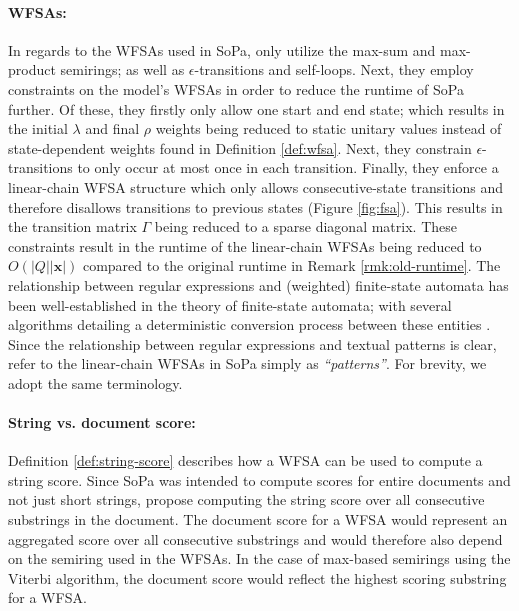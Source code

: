 \paragraph{WFSAs:} In regards to the WFSAs used in SoPa, \citet{schwartz2018sopa} only utilize the max-sum and max-product semirings; as well as $\epsilon$-transitions and self-loops. Next, they employ constraints on the model's WFSAs in order to reduce the runtime of SoPa further. Of these, they firstly only allow one start and end state; which results in the initial $\lambda$ and final $\rho$ weights being reduced to static unitary values instead of state-dependent weights found in Definition \ref{def:wfsa}. Next, they constrain $\epsilon$-transitions to only occur at most once in each transition. Finally, they enforce a linear-chain WFSA structure which only allows consecutive-state transitions and therefore disallows transitions to previous states (Figure \ref{fig:fsa}). This results in the transition matrix $\Gamma$ being reduced to a sparse diagonal matrix. These constraints result in the runtime of the linear-chain WFSAs being reduced to $O(|Q||\pmb{x}|)$ compared to the original runtime in Remark \ref{rmk:old-runtime}. The relationship between regular expressions and (weighted) finite-state automata has been well-established in the theory of finite-state automata; with several algorithms detailing a deterministic conversion process between these entities \citep{thompson1968programming,jiang2020cold}. Since the relationship between regular expressions and textual patterns is clear, \citet[Page 3, Section 3.1]{schwartz2018sopa} refer to the linear-chain WFSAs in SoPa simply as \textit{``patterns''}. For brevity, we adopt the same terminology.

\paragraph{String vs. document score:} Definition \ref{def:string-score} describes how a WFSA can be used to compute a string score. Since SoPa was intended to compute scores for entire documents and not just short strings, \citet{schwartz2018sopa} propose computing the string score over all consecutive substrings in the document. The document score for a WFSA would represent an aggregated score over all consecutive substrings and would therefore also depend on the semiring used in the WFSAs. In the case of max-based semirings using the Viterbi algorithm, the document score would reflect the highest scoring substring for a WFSA.

